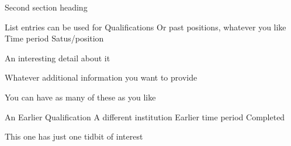 \begin{tmrsection}{Second section heading}

\tmrlistentry
    {List entries can be used for Qualifications}
    {Or past positions, whatever you like}
    {Time period}
    {Satus/position}
    {\item  An interesting detail about it
    	\item Whatever additional information you want to provide
    	\item You can have as many of these as you like}
    
\tmrlistentry
    {An Earlier Qualification}
    {A different institution}
    {Earlier time period}
    {Completed}
    {\item This one has just one tidbit of interest}
	
\end{tmrsection}